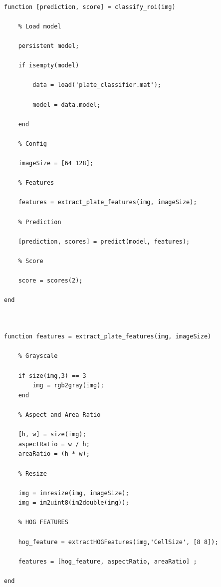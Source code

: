\begin{verbatim}

function [prediction, score] = classify_roi(img)

    % Load model
    
    persistent model;
    
    if isempty(model)
    
        data = load('plate_classifier.mat');
    
        model = data.model;
    
    end
    
    % Config
    
    imageSize = [64 128];
    
    % Features
    
    features = extract_plate_features(img, imageSize);
    
    % Prediction
    
    [prediction, scores] = predict(model, features);
    
    % Score
    
    score = scores(2);

end
    
\end{verbatim}


\begin{verbatim}

function features = extract_plate_features(img, imageSize)
    
    % Grayscale
    
    if size(img,3) == 3
        img = rgb2gray(img);
    end

    % Aspect and Area Ratio

    [h, w] = size(img);
    aspectRatio = w / h;
    areaRatio = (h * w);
    
    % Resize
    
    img = imresize(img, imageSize);
    img = im2uint8(im2double(img));
    
    % HOG FEATURES
    
    hog_feature = extractHOGFeatures(img,'CellSize', [8 8]);

    features = [hog_feature, aspectRatio, areaRatio] ;

end
    
\end{verbatim}

